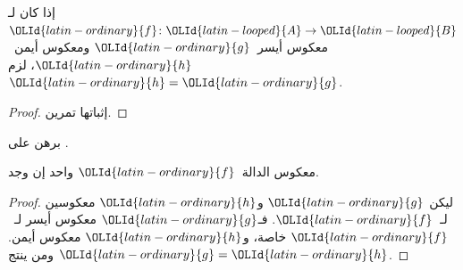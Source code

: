 \documentclass[../../../include/open-logic-section]{subfiles}
\begin{document}
\begin{prop}%
إذا كان لـ${\OLId{latin-ordinary}{f}}\colon {\OLId{latin-looped}{A}} \to {\OLId{latin-looped}{B}}$ معكوس أيسر~${\OLId{latin-ordinary}{g}}$ ومعكوس أيمن~${\OLId{latin-ordinary}{h}}$، لزم ${\OLId{latin-ordinary}{h}} = {\OLId{latin-ordinary}{g}}$.
\end{prop}

\begin{proof}
إثباتها تمرين.
\end{proof}

\begin{prob}
برهن على .
\end{prob}

\begin{prop}
معكوس الدالة~${\OLId{latin-ordinary}{f}}$ واحد إن وجد.
\end{prop}

\begin{proof}
ليكن ${\OLId{latin-ordinary}{g}}$ و${\OLId{latin-ordinary}{h}}$ معكوسين لـ~${\OLId{latin-ordinary}{f}}$. فـ${\OLId{latin-ordinary}{g}}$ معكوس أيسر لـ~${\OLId{latin-ordinary}{f}}$ خاصة،
و${\OLId{latin-ordinary}{h}}$ معكوس أيمن. ومن  ينتج ${\OLId{latin-ordinary}{g}} = {\OLId{latin-ordinary}{h}}$.
\end{proof}
\end{document}
